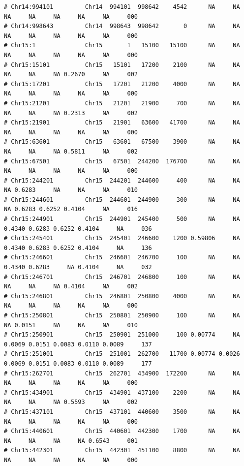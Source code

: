 \documentclass{article}\usepackage[]{graphicx}\usepackage[]{color}
\makeatletter
\newenvironment{kframe}{%
 \def\at@end@of@kframe{}%
 \ifinner\ifhmode%
  \def\at@end@of@kframe{\end{minipage}}%
  \begin{minipage}{\columnwidth}%
 \fi\fi%
 \def\FrameCommand##1{\hskip\@totalleftmargin \hskip-\fboxsep
 \colorbox{shadecolor}{##1}\hskip-\fboxsep
     \hskip-\linewidth \hskip-\@totalleftmargin \hskip\columnwidth}%
 \MakeFramed {\advance\hsize-\width
   \@totalleftmargin\z@ \linewidth\hsize
   \@setminipage}}%
 {\par\unskip\endMakeFramed%
 \at@end@of@kframe}
\newenvironment{knitrout}{}{} %
\makeatother
\begin{document}
\begin{knitrout}
\begin{kframe}
\begin{verbatim}
# Chr14:994101         Chr14  994101  998642    4542      NA     NA     NA     NA     NA     NA     NA     000
# Chr14:998643         Chr14  998643  998642       0      NA     NA     NA     NA     NA     NA     NA     000
# Chr15:1              Chr15       1   15100   15100      NA     NA     NA     NA     NA     NA     NA     000
# Chr15:15101          Chr15   15101   17200    2100      NA     NA     NA     NA     NA 0.2670     NA     002
# Chr15:17201          Chr15   17201   21200    4000      NA     NA     NA     NA     NA     NA     NA     000
# Chr15:21201          Chr15   21201   21900     700      NA     NA     NA     NA     NA 0.2313     NA     002
# Chr15:21901          Chr15   21901   63600   41700      NA     NA     NA     NA     NA     NA     NA     000
# Chr15:63601          Chr15   63601   67500    3900      NA     NA     NA     NA     NA 0.5811     NA     002
# Chr15:67501          Chr15   67501  244200  176700      NA     NA     NA     NA     NA     NA     NA     000
# Chr15:244201         Chr15  244201  244600     400      NA     NA     NA 0.6283     NA     NA     NA     010
# Chr15:244601         Chr15  244601  244900     300      NA     NA     NA 0.6283 0.6252 0.4104     NA     016
# Chr15:244901         Chr15  244901  245400     500      NA     NA 0.4340 0.6283 0.6252 0.4104     NA     036
# Chr15:245401         Chr15  245401  246600    1200 0.59806     NA 0.4340 0.6283 0.6252 0.4104     NA     136
# Chr15:246601         Chr15  246601  246700     100      NA     NA 0.4340 0.6283     NA 0.4104     NA     032
# Chr15:246701         Chr15  246701  246800     100      NA     NA     NA     NA     NA 0.4104     NA     002
# Chr15:246801         Chr15  246801  250800    4000      NA     NA     NA     NA     NA     NA     NA     000
# Chr15:250801         Chr15  250801  250900     100      NA     NA     NA 0.0151     NA     NA     NA     010
# Chr15:250901         Chr15  250901  251000     100 0.00774     NA 0.0069 0.0151 0.0083 0.0110 0.0089     137
# Chr15:251001         Chr15  251001  262700   11700 0.00774 0.0026 0.0069 0.0151 0.0083 0.0110 0.0089     177
# Chr15:262701         Chr15  262701  434900  172200      NA     NA     NA     NA     NA     NA     NA     000
# Chr15:434901         Chr15  434901  437100    2200      NA     NA     NA     NA     NA 0.5593     NA     002
# Chr15:437101         Chr15  437101  440600    3500      NA     NA     NA     NA     NA     NA     NA     000
# Chr15:440601         Chr15  440601  442300    1700      NA     NA     NA     NA     NA     NA 0.6543     001
# Chr15:442301         Chr15  442301  451100    8800      NA     NA     NA     NA     NA     NA     NA     000

\end{verbatim}
\end{kframe}
\end{knitrout}
\end{document}
